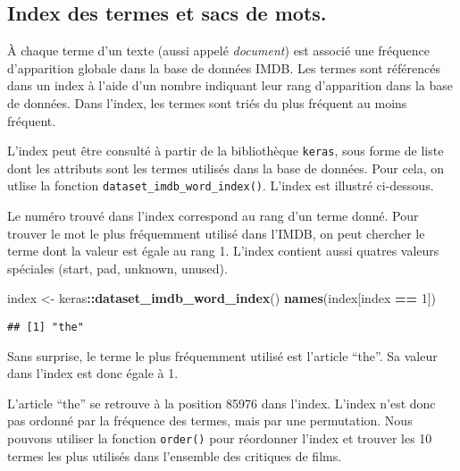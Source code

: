 \documentclass[]{article}
\newenvironment{Shaded}{\begin{snugshade}}{\end{snugshade}}
\newcommand{\KeywordTok}[1]{\textcolor[rgb]{0.13,0.29,0.53}{\textbf{#1}}}
\newcommand{\DecValTok}[1]{\textcolor[rgb]{0.00,0.00,0.81}{#1}}
\newcommand{\StringTok}[1]{\textcolor[rgb]{0.31,0.60,0.02}{#1}}
\newcommand{\OperatorTok}[1]{\textcolor[rgb]{0.81,0.36,0.00}{\textbf{#1}}}
\newcommand{\NormalTok}[1]{#1}
\begin{document}
\subsection{Index des termes et sacs de
mots.}\label{index-des-termes-et-sacs-de-mots.}

À chaque terme d'un texte (aussi appelé \emph{document}) est associé une
fréquence d'apparition globale dans la base de données IMDB. Les termes
sont référencés dans un index à l'aide d'un nombre indiquant leur rang
d'apparition dans la base de données. Dans l'index, les termes sont
triés du plus fréquent au moins fréquent.

L'index peut être consulté à partir de la bibliothèque \texttt{keras},
sous forme de liste dont les attributs sont les termes utilisés dans la
base de données. Pour cela, on utlise la fonction
\texttt{dataset\_imdb\_word\_index()}. L'index est illustré ci-dessous.

Le numéro trouvé dans l'index correspond au rang d'un terme donné. Pour
trouver le mot le plus fréquemment utilisé dans l'IMDB, on peut chercher
le terme dont la valeur est égale au rang 1. L'index contient aussi
quatres valeurs spéciales (start, pad, unknown, unused).

\begin{Shaded}
\begin{Highlighting}[]
\NormalTok{  index <-}\StringTok{ }\NormalTok{keras}\OperatorTok{::}\KeywordTok{dataset_imdb_word_index}\NormalTok{()}
  \KeywordTok{names}\NormalTok{(index[index }\OperatorTok{==}\StringTok{ }\DecValTok{1}\NormalTok{])}
\end{Highlighting}
\end{Shaded}

\begin{verbatim}
## [1] "the"
\end{verbatim}

Sans surprise, le terme le plus fréquemment utilisé est l'article
``the''. Sa valeur dans l'index est donc égale à 1.

L'article ``the'' se retrouve à la position 85976 dans l'index. L'index
n'est donc pas ordonné par la fréquence des termes, mais par une
permutation. Nous pouvons utiliser la fonction \texttt{order()} pour
réordonner l'index et trouver les 10 termes les plus utilisés dans
l'ensemble des critiques de films.

\begin{Shaded}
\end{Shaded}
\end{document}
